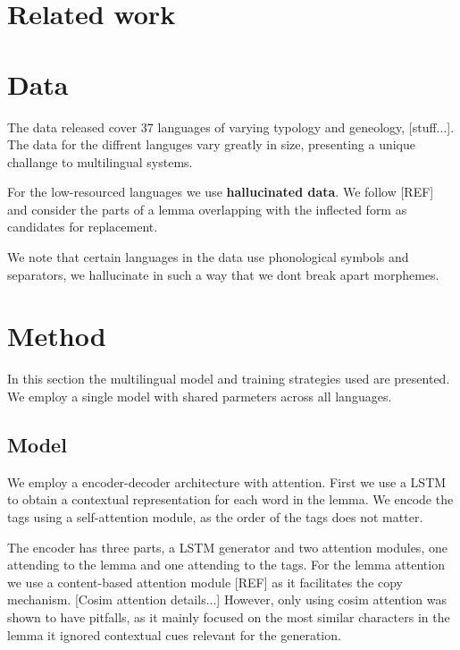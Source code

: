 \documentclass[11pt,a4paper]{article}
\begin{document}
\section{Related work}

\section{Data}

The data released cover 37 languages of varying typology and
geneology, [stuff...]. The data for the diffrent languges vary greatly
in size, presenting a unique challange to multilingual systems.

For the low-resourced languages we use \textbf{hallucinated data}. We
follow [REF] and consider the parts of a lemma overlapping with the
inflected form as candidates for replacement.

We note that certain languages in the data use phonological symbols
and separators, we hallucinate in such a way that we dont break apart
morphemes.


\section{Method}

In this section the multilingual model and training strategies used
are presented. We employ a single model with shared parmeters
across all languages. 

\subsection{Model}

We employ a encoder-decoder architecture with attention. First we use
a LSTM to obtain a contextual representation for each word in the
lemma. We encode the tags using a self-attention module, as the order
of the tags does not matter.

The encoder has three parts, a LSTM generator and two attention
modules, one attending to the lemma and one attending to the tags. For
the lemma attention we use a content-based attention module [REF] as
it facilitates the copy mechanism. [Cosim attention details...]
However, only using cosim attention was shown to have pitfalls, as it
mainly focused on the most similar characters in the lemma it ignored
contextual cues relevant for the generation.
\end{document}
